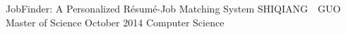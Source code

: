 \maketitlepage
{JobFinder: A Personalized R\'esum\'e-Job Matching System
}   %
{SHIQIANG~~GUO}%
{Master of Science}                %
{October 2014}%
{Computer Science}         %
